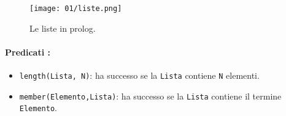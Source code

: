 
\begin{figure}[h]
    \centering
    \texttt{[image: 01/liste.png]}
    \caption{Le liste in prolog.}
\end{figure}

\paragraph{Predicati :}

\begin{itemize}
  \item \texttt{length(Lista, N)}: ha successo se la \texttt{Lista} contiene \texttt{N} elementi. 
  \item \texttt{member(Elemento,Lista)}: ha successo se la \texttt{Lista} contiene il termine \texttt{Elemento}.
\end{itemize}



